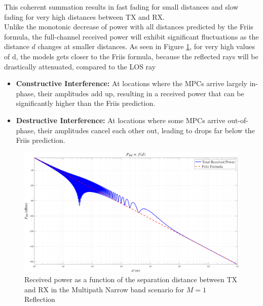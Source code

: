 This coherent summation results in fast fading for small distances and slow fading for very high distances between TX and RX. \\
Unlike the monotonic decrease of power with all distances predicted by the Friis formula, the full-channel received power will exhibit significant fluctuations as the distance $d$ changes at smaller distances. As seen in Figure \ref{fig:pRX_vs_friis}, for very high values of d, the models gets closer to the Friis formula, because the reflected rays will be drastically attenuated, compared to the LOS ray
\begin{itemize}
	\item \textbf{Constructive Interference:} At locations where the MPCs arrive largely in-phase, their amplitudes add up, resulting in a received power that can be significantly higher than the Friis prediction.
	\item \textbf{Destructive Interference:} At locations where some MPCs arrive out-of-phase, their amplitudes cancel each other out, leading to drops far below the Friis prediction.
\end{itemize}

\begin{figure}[h!]
	\centering
	\includegraphics[width=\linewidth]{content/4-images/PRX-vs-Friis.png} %
	\caption{Received power as a function of the separation distance between TX and RX in the Multipath Narrow band scenario for $M=1$ Reflection}
	\label{fig:pRX_vs_friis}
\end{figure}

